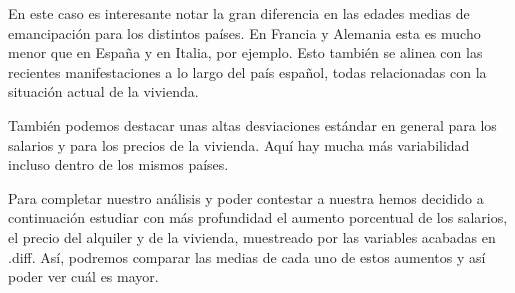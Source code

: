 \documentclass[water,article,submit,pdftex,moreauthors]{Definitions/mdpi}
\begin{document}
\begin{table}[H]
\caption{Media y desviación típica (SD) por país de las variables numéricas (5 países más poblados).}
\centering\footnotesize\setlength{\tabcolsep}{3pt}
\end{table}

En este caso es interesante notar la gran diferencia en las edades
medias de emancipación para los distintos países. En Francia y Alemania
esta es mucho menor que en España y en Italia, por ejemplo. Esto también
se alinea con las recientes manifestaciones a lo largo del país español,
todas relacionadas con la situación actual de la vivienda.

También podemos destacar unas altas desviaciones estándar en general
para los salarios y para los precios de la vivienda. Aquí hay mucha más
variabilidad incluso dentro de los mismos países.

Para completar nuestro análisis y poder contestar a nuestra hemos
decidido a continuación estudiar con más profundidad el aumento
porcentual de los salarios, el precio del alquiler y de la vivienda,
muestreado por las variables acabadas en .diff. Así, podremos comparar
las medias de cada uno de estos aumentos y así poder ver cuál es mayor.
\end{document}
